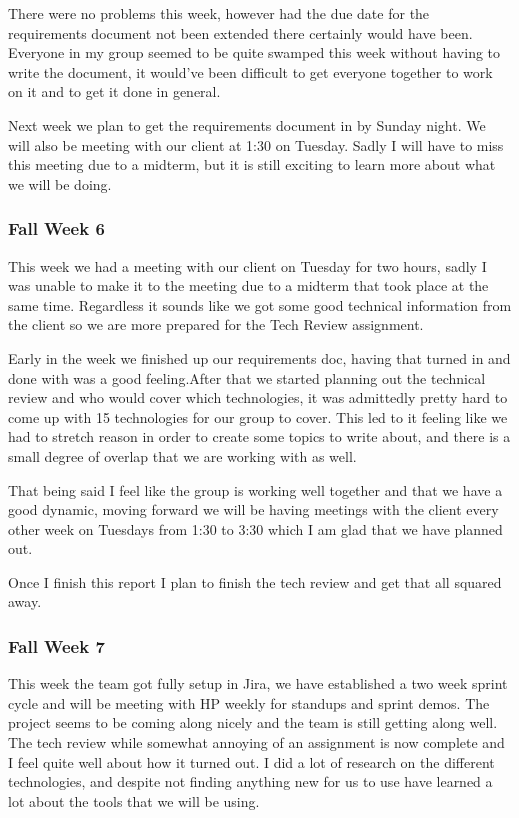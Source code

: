 \documentclass[onecolumn, draftclsnofoot,10pt, compsoc]{IEEEtran}
\begin{document}
There were no problems this week, however had the due date for the requirements document not been extended there certainly would have been. Everyone in my group seemed to be quite swamped this week without having to write the document, it would've been difficult to get everyone together to work on it and to get it done in general.

Next week we plan to get the requirements document in by Sunday night. We will also be meeting with our client at 1:30 on Tuesday. Sadly I will have to miss this meeting due to a midterm, but it is still exciting to learn more about what we will be doing.

\subsubsection*{Fall Week 6}
This week we had a meeting with our client on Tuesday for two hours, sadly I was unable to make it to the meeting due to a midterm that took place at the same time. Regardless it sounds like we got some good technical information from the client so we are more prepared for the Tech Review assignment.

Early in the week we finished up our requirements doc, having that turned in and done with was a good feeling.After that we started planning out the technical review and who would cover which technologies, it was admittedly pretty hard to come up with 15 technologies for our group to cover. This led to it feeling like we had to stretch reason in order to create some topics to write about, and there is a small degree of overlap that we are working with as well.

That being said I feel like the group is working well together and that we have a good dynamic, moving forward we will be having meetings with the client every other week on Tuesdays from 1:30 to 3:30 which I am glad that we have planned out.

Once I finish this report I plan to finish the tech review and get that all squared away.

\subsubsection*{Fall Week 7}
This week the team got fully setup in Jira, we have established a two week sprint cycle and will be meeting with HP weekly for standups and sprint demos. The project seems to be coming along nicely and the team is still getting along well. The tech review while somewhat annoying of an assignment is now complete and I feel quite well about how it turned out. I did a lot of research on the different technologies, and despite not finding anything new for us to use have learned a lot about the tools that we will be using.
\end{document}
